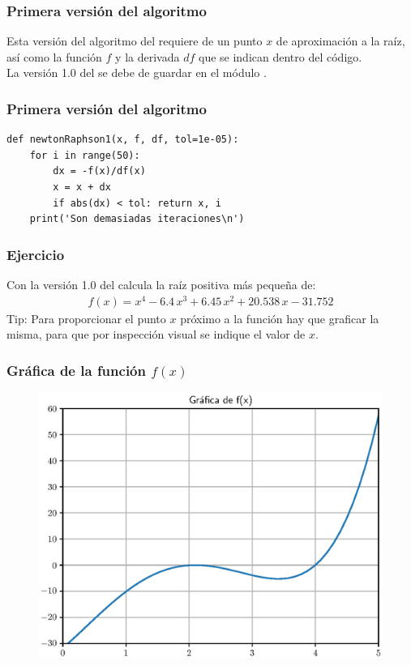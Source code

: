 \documentclass[12pt]{beamer}
\begin{document}
\begin{frame}
\frametitle{Primera versión del algoritmo}
Esta versión del algoritmo del  requiere de un punto $x$ de aproximación a la raíz, así como la función $f$ y la derivada $df$ que se indican dentro del código.
\\
\bigskip
\pause
La versión 1.0 del  se debe de guardar en el módulo .
\end{frame}
\begin{frame}[fragile]
\frametitle{Primera versión del algoritmo}
\begin{lstlisting}[caption=Primera versión del MNR]
def newtonRaphson1(x, f, df, tol=1e-05):
    for i in range(50):
        dx = -f(x)/df(x)
        x = x + dx
        if abs(dx) < tol: return x, i
    print('Son demasiadas iteraciones\n')
\end{lstlisting}
\end{frame}
\begin{frame}
\frametitle{Ejercicio}
Con la versión 1.0 del  calcula la raíz positiva más pequeña de:
\begin{align*}
f (x) = x^{4} - 6.4 \, x^{3} + 6.45 \, x^{2} + 20.538 \, x - 31.752
\end{align*}
\pause
Tip: Para proporcionar el punto $x$ próximo a la función hay que graficar la misma, para que por inspección visual se indique el valor de $x$.
\end{frame}
\begin{frame}
\frametitle{Gráfica de la función $f (x)$}
\begin{figure}
    \centering
    \includegraphics[scale=0.55]{Imagenes/raices_03_MNR_01.eps}
\end{figure}
\end{frame}
\end{document}

